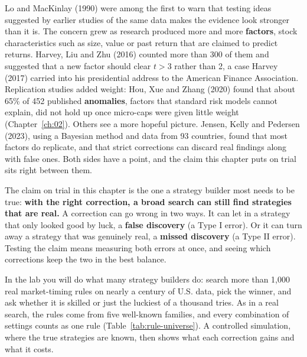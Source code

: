 Lo and MacKinlay (1990) were among the first to warn that testing ideas
suggested by earlier studies of the same data makes the evidence look stronger
than it is. The concern grew as research produced more and more
\textbf{factors}, stock characteristics such as size, value or past return
that are claimed to predict returns. Harvey, Liu and Zhu (2016) counted more
than 300 of them and suggested that a new factor should clear $t > 3$ rather
than 2, a case Harvey (2017) carried into his presidential address to the
American Finance Association. Replication studies added weight: Hou, Xue and
Zhang (2020) found that about 65\% of 452 published \textbf{anomalies},
factors that standard risk models cannot explain, did not hold up once
micro-caps were given little weight (Chapter~\ref{ch:02}).
Others see a more hopeful picture. Jensen, Kelly and Pedersen (2023), using a
Bayesian method and data from 93 countries, found that most factors do
replicate, and that strict corrections can discard real findings along with
false ones. Both sides have a point, and the claim this chapter puts on trial
sits right between them.

The claim on trial in this chapter is the one a strategy builder most needs to
be true: \textbf{with the right correction, a broad search can still find
strategies that are real.} A correction can go wrong in two ways. It can let
in a strategy that only looked good by luck, a \textbf{false discovery} (a
Type I error). Or it can turn away a strategy that was genuinely real, a
\textbf{missed discovery} (a Type II error). Testing the claim means measuring
both errors at once, and seeing which corrections keep the two in the best
balance.

In the lab you will do what many strategy builders do: search more than 1,000
real market-timing rules on nearly a century of U.S. data, pick the winner, and
ask whether it is skilled or just the luckiest of a thousand tries. As in a real
search, the rules come from five well-known families, and every combination of
settings counts as one rule (Table~\ref{tab:rule-universe}). A controlled
simulation, where the true strategies are known, then shows what each
correction gains and what it costs.



